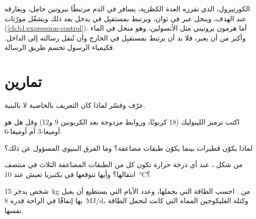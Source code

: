 \begin{example}\label{ex:b1:lipids:steroidhormone}
الكورتيزول، الذي تفرزه الغدة الكظرية، يسافر في الدم مرتبطًا ببروتين
حامل، ويفارقه عند  الهدف، وينحل عبر  في ثوان،
ويرتبط بمستقبِل في  يدخل بعد ذلك  ويشغّل
مورّثات (\cref{ch:b1:expression-control}). أما هرمون بروتيني مثل
الأنسولين، وهو منحل في الماء وأكبر من أن يعبر، فلا بد أن يرتبط
بمستقبِل في الخارج وأن تُنقل رسالته إلى الداخل. فكيمياء الرسول تحسم
طريق الرسالة.
\end{example}

\section{تمارين}

\begin{exercise}[$\star$]\label{exo:b1:lipids:1}
عرّف  وفسّر لماذا كان التعريف بالخاصية لا بالبنية.
\end{exercise}

\begin{exercise}[$\star$]\label{exo:b1:lipids:2}
اكتب ترميز  اللينوليك (18 كربونًا، وروابط مزدوجة بعد الكربونين 9
و12) وقل هل هو  أوميغا-3 أم أوميغا-6.
\end{exercise}

\begin{exercise}[$\star$]\label{exo:b1:lipids:3}
لماذا يكوّن  قطيرات بينما يكوّن  طبقات
مضاعفة؟ وما الفرق البنيوي المسؤول عن ذلك؟
\end{exercise}

\begin{exercise}[$\star$]\label{exo:b1:lipids:4}
من شكل ، عند أي درجة حرارة تكون كل من الطبقات المضاعفة الثلاث
في منتصف انتقالها؟ وأيها تتوقعها في بكتيريا تعيش عند
\qty{10}{\celsius}؟
\end{exercise}

\begin{exercise}[$\star\star$]\label{exo:b1:lipids:5}
شخص يدخر \qty{15}{kg} من . احسب الطاقة التي يحملها، وعدد الأيام
التي يستطيع أن يعيل بها إنفاقًا في الراحة قدره \qty{8}{MJ/d}، وكتلة
الغليكوجين المماه التي كانت لتحمل الطاقة نفسها.
\end{exercise}

